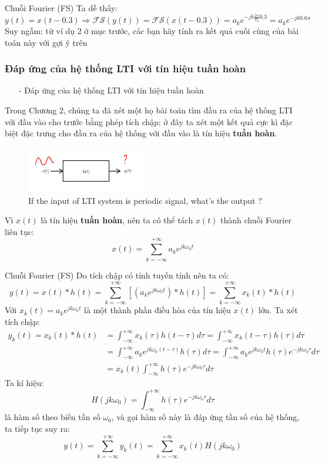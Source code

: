 \documentclass[8pt]{beamer}
\begin{document}
\begin{frame}{Chuỗi Fourier (FS)}
Ta dễ thấy:
$$y(t)=x(t-0.3)\Rightarrow \mathscr{FS}(y(t))=\mathscr{FS}(x(t-0.3))=a_{k}e^{-jk\frac{2\pi}{T_{0}}0.3}=a_{k}e^{-jk0.6\pi}$$
Suy ngẫm: từ ví dụ 2 ở mục trước, các bạn hãy tính ra kết quả cuối cùng của bài toán này với gợi ý trên
\subsubsection{Đáp ứng của hệ thống LTI với tín hiệu tuần hoàn}
\begin{itemize}
	\item[-] Đáp ứng của hệ thống LTI với tín hiệu tuần hoàn
\end{itemize}
Trong \alert{Chương 2}, chúng ta đã xét một họ bài toán tìm đầu ra của hệ thống LTI với đầu vào cho trước bằng phép tích chập; ở đây ta xét một kết quả cực kì đặc biệt đặc trưng cho đầu ra của hệ thống với đầu vào là tín hiệu \textbf{tuần hoàn}. 
\begin{figure}[h]
			\includegraphics[width=0.46\textwidth]{ht.jpg}
			\caption{If the input of LTI system is periodic signal, what's the output ?}\label{fig:re11}

		\end{figure}
Vì $x(t)$ là tín hiệu \textbf{tuần hoàn}, nên ta có thể tách $x(t)$ thành chuỗi Fourier liên tục:
$$x(t)=\sum_{k=-\infty}^{+\infty}a_{k}e^{jk\omega_{0} t}$$
\end{frame}
\begin{frame}{Chuỗi Fourier (FS)}
Do tích chập có tính \alert{tuyến tính} nên ta có:
$$y(t)=x(t)*h(t)=\sum_{k=-\infty}^{+\infty}[(a_{k}e^{jk\omega_{0}t})*h(t)]=\sum_{k=-\infty}^{+\infty}x_{k}(t)*h(t)$$
Với $x_{k}(t)=a_{k}e^{jk\omega_{0}t}$ là một thành phần điều hòa của tín hiệu $x(t)$ lớn. Ta xét tích chập:
\begin{equation*}
\begin{split}
	y_{k}(t)=x_{k}(t)*h(t)&=\int_{-\infty}^{+\infty}x_{k}(\tau)h(t-\tau)d\tau=\int_{-\infty}^{+\infty}x_{k}(t-\tau)h(\tau)d\tau\\&=\int_{-\infty}^{+\infty}a_{k}e^{jk\omega_{0}(t-\tau)}h(\tau)d\tau=\int_{-\infty}^{+\infty}a_{k}e^{jk\omega_{0} t}h(\tau)e^{-jk\omega_{0}\tau}d\tau\\&=x_{k}(t)\int_{-\infty}^{+\infty}h(\tau)e^{-jk\omega_{0}\tau}d\tau
\end{split}
\end{equation*}
Ta kí hiệu:
$$H(jk\omega_{0})=\int_{-\infty}^{+\infty}h(\tau)e^{-jk\omega_{0}\tau}d\tau$$
là hàm số theo biến tần số $\omega_{0}$, và gọi hàm số này là \alert{đáp ứng tần số của hệ thống},
ta tiếp tục suy ra:
$$y(t)=\sum_{k=-\infty}^{+\infty}y_{k}(t)=\sum_{k=-\infty}^{+\infty}x_{k}(t)H(jk\omega_{0})$$
\end{frame}
\end{document}
